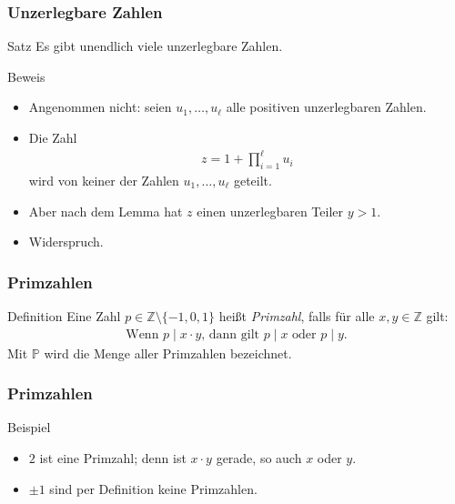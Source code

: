 \documentclass{beamer}
\renewcommand{\emph}[1]{{\textcolor{solarizedRed}{\itshape #1}}}
\newcommand\ZZ{\mathbb Z}
\newcommand\PP{\mathbb P}
\newcommand{\ue}{\"u}
\begin{document}
\begin{frame}\frametitle{Unzerlegbare Zahlen}
	\begin{block}{Satz}
		Es gibt unendlich viele unzerlegbare Zahlen.
	\end{block}
	\begin{block}{Beweis}
		\begin{itemize}
			\item Angenommen nicht: seien $u_1,\ldots,u_\ell$ alle positiven unzerlegbaren Zahlen.
			\item Die Zahl
				\begin{align*}
					z=1+\prod_{i=1}^\ell u_i
				\end{align*}
				wird von keiner der Zahlen $u_1,\ldots,u_\ell$ geteilt.
			\item Aber nach dem Lemma hat $z$ einen unzerlegbaren Teiler $y>1$.
			\item Widerspruch.
		\end{itemize}	
	\end{block}
\end{frame}

\begin{frame}\frametitle{Primzahlen}
	\begin{block}{Definition}
		Eine Zahl $p\in\ZZ\setminus\{-1,0,1\}$ hei\ss t \emph{Primzahl}, falls f\ue r alle $x,y\in\ZZ$ gilt:
		\begin{align*}
			\mbox{Wenn $p\mid x\cdot y$, dann gilt $p\mid x$ oder $p\mid y$.}
		\end{align*}
		Mit $\PP$ wird die Menge aller Primzahlen bezeichnet.
	\end{block}
\end{frame}

\begin{frame}\frametitle{Primzahlen}
	\begin{block}{Beispiel}
		\begin{itemize}
			\item $2$ ist eine Primzahl; denn ist $x\cdot y$ gerade, so auch $x$ oder $y$.
			\item $\pm1$ sind per Definition keine Primzahlen.
		\end{itemize}
	\end{block}
\end{frame}
\end{document}
